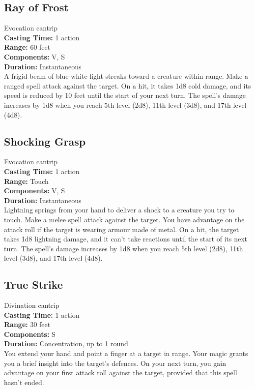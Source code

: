 \documentclass[11pt, A4paper, english]{article}
\begin{document}
		\subsection{Ray of Frost}
Evocation cantrip \\
\textbf{Casting Time:} 1 action \\
\textbf{Range:} 60 feet \\
\textbf{Components:} V, S \\
\textbf{Duration:} Instantaneous \\
A frigid beam of blue-white light streaks toward a creature within range. Make a ranged spell attack against the target. On a hit, it takes 1d8 cold damage, and its speed is reduced by 10 feet until the start of your next turn. The spell’s damage increases by 1d8 when you reach 5th level (2d8), 11th level (3d8), and 17th level (4d8).

		\subsection{Shocking Grasp}
Evocation cantrip \\
\textbf{Casting Time:} 1 action \\
\textbf{Range:} Touch \\
\textbf{Components:} V, S \\
\textbf{Duration:} Instantaneous \\
Lightning springs from your hand to deliver a shock to a creature you try to touch. Make a melee spell attack against the target. You have advantage on the attack roll if the target is wearing armour made of metal. On a hit, the target takes  1d8 lightning damage, and it can't take reactions until the start of its next turn. The spell's damage increases by 1d8 when you reach 5th level (2d8), 11th level (3d8), and 17th level (4d8).

		\subsection{True Strike}
Divination cantrip \\
\textbf{Casting Time:} 1 action \\
\textbf{Range:} 30 feet \\
\textbf{Components:} S \\
\textbf{Duration:} Concentration, up to 1 round \\
You extend your hand and point a finger at a target in range. Your magic grants you a brief insight into the target's defences. On your next turn, you gain advantage on your first attack roll against the target, provided that this spell hasn't ended.
\end{document}
